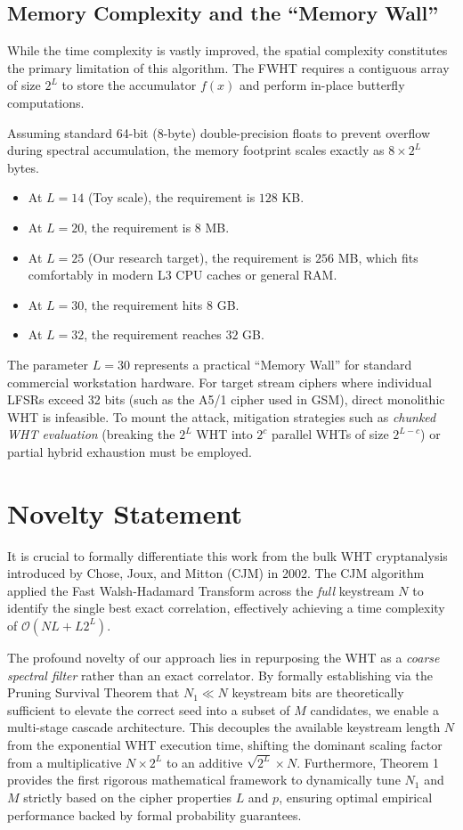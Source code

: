 \subsection{Memory Complexity and the ``Memory Wall''}
While the time complexity is vastly improved, the spatial complexity constitutes the primary limitation of this algorithm. The FWHT requires a contiguous array of size $2^L$ to store the accumulator $f(x)$ and perform in-place butterfly computations. 

Assuming standard 64-bit (8-byte) double-precision floats to prevent overflow during spectral accumulation, the memory footprint scales exactly as $8 \times 2^L$ bytes. 

\begin{itemize}
    \item At $L=14$ (Toy scale), the requirement is $128$ KB.
    \item At $L=20$, the requirement is $8$ MB.
    \item At $L=25$ (Our research target), the requirement is $256$ MB, which fits comfortably in modern L3 CPU caches or general RAM.
    \item At $L=30$, the requirement hits $8$ GB.
    \item At $L=32$, the requirement reaches $32$ GB.
\end{itemize}

The parameter $L=30$ represents a practical ``Memory Wall'' for standard commercial workstation hardware. For target stream ciphers where individual LFSRs exceed 32 bits (such as the A5/1 cipher used in GSM), direct monolithic WHT is infeasible. To mount the attack, mitigation strategies such as \textit{chunked WHT evaluation} (breaking the $2^L$ WHT into $2^c$ parallel WHTs of size $2^{L-c}$) or partial hybrid exhaustion must be employed. 

\section{Novelty Statement}
\label{sec:novelty}

It is crucial to formally differentiate this work from the bulk WHT cryptanalysis introduced by Chose, Joux, and Mitton (CJM) in 2002. The CJM algorithm applied the Fast Walsh-Hadamard Transform across the \textit{full} keystream $N$ to identify the single best exact correlation, effectively achieving a time complexity of $\mathcal{O}(N L + L 2^L)$.

The profound novelty of our approach lies in repurposing the WHT as a \textit{coarse spectral filter} rather than an exact correlator. By formally establishing via the Pruning Survival Theorem that $N_1 \ll N$ keystream bits are theoretically sufficient to elevate the correct seed into a subset of $M$ candidates, we enable a multi-stage cascade architecture. This decouples the available keystream length $N$ from the exponential WHT execution time, shifting the dominant scaling factor from a multiplicative $N \times 2^L$ to an additive $\sqrt{2^L} \times N$. Furthermore, Theorem 1 provides the first rigorous mathematical framework to dynamically tune $N_1$ and $M$ strictly based on the cipher properties $L$ and $p$, ensuring optimal empirical performance backed by formal probability guarantees.
